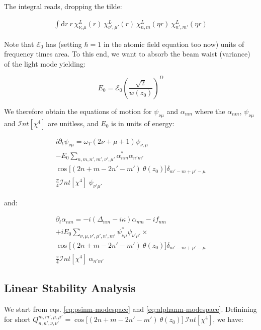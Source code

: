 \documentclass[a4paper,twocolumn,nobalancelastpage]{revtex4-1}
\newcommand{\af}{\psi_{\nu\mu}}
\newcommand{\lf}{\alpha_{nm}}
\newcommand{\lfp}{\alpha_{n'm'}}
\newcommand{\intfour}{\mathcal{I}nt[\chi^4]}
\begin{document}
The integral reads, dropping the tilde:

\begin{multline}
\int \mathrm{d}r \ r \ \chi_{\nu, \mu}^L (r) \ \chi_{\nu', \mu'}^L (r) \ \chi_{n,m}^L (\eta r) \ \chi_{n',m'}^L (\eta r)
\end{multline}

Note that $\mathcal{E}_0$ has (setting $\hbar=1$ in the atomic field equation too now) units of frequency times area.
To this end, we want to absorb the beam waist (variance) of the light mode yielding:

\begin{equation}
E_0=\mathcal{E}_0 \left(\frac{\sqrt{2}}{w(z_0)} \right)^D
\end{equation}

We therefore obtain the equations of motion for $\af$ and $\lf$ where the $\lf$, $\af$ and $\intfour$ are unitless, and $E
_0$ is in units of energy:


\begin{multline}
\label{eq:psinm-modespace}
i\partial_t \psi_{\nu \mu} = \omega_T (2\nu+\mu+1) \psi_{\nu, \mu}
\\ - E_0 \sum_{n,m,n',m', \nu', \mu'} \lf^* \lfp
\\ \cos \big[(2n+m-  2n'-m') \ \theta(z_0)\big] 
\delta_{m'-m+\mu'-\mu} \\ \frac{\pi}{4} \intfour \ \psi_{\nu'\mu'} 
\end{multline}

and:

\begin{multline}
\label{eq:alphanm-modespace}
\partial_t \alpha_{nm}= -i(\Delta_{nm}-i\kappa) \alpha_{nm}-if_{nm} \\ +i E_0 \sum_{\nu, \mu,\nu', \mu',n',m'} \psi_{\nu\mu}^* \psi_{\nu'\mu'} \times \\     
\cos \big[(2n+m-  2n'-m') \ \theta(z_0)\big]  \delta_{m'-m+\mu'-\mu} \\ 
\frac{\pi}{4}  \intfour \ \alpha_{n'm'} 
\end{multline}

\subsection{Linear Stability Analysis}

We start from eqs. \eqref{eq:psinm-modespace} and \eqref{eq:alphanm-modespace}. Definining for short $Q^{m,m',\mu,\mu'}_{n,n',\nu,\nu'}=\cos \big[(2n+m-  2n'-m')\ \theta(z_0)\big]  \ \intfour$, we have:
\end{document}
